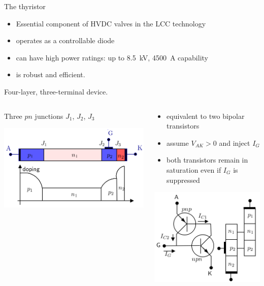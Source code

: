 \begin{frame}[allowframebreaks]{The thyristor}
\begin{itemize}
    \item Essential component of HVDC valves in the LCC technology
    \item operates as a controllable diode
    \item can have high power ratings: up to \SI{8.5}{kV}, \SI{4500}{A} capability
    \item is robust and efficient.
\end{itemize}
Four-layer, three-terminal device.
\begin{columns}
\begin{column}{0.5\linewidth}
Three $pn$ junctions $J_1$, $ J_2$, $J_3$
\begin{center}
    \includegraphics[width=1.0\linewidth]{images/thyristor1.png}
\end{center}
\end{column}
\begin{column}{0.5\linewidth}
\begin{itemize}
    \item equivalent to two bipolar transistors
    \item assume $V_{AK}>0$ and inject $I_G$
    \item both transistors remain in saturation even if $I_G$ is suppressed
\end{itemize}
\begin{center}
    \includegraphics[width=0.5\linewidth]{images/thyristor2.png}
\end{center}
\end{column}
\end{columns}
\end{frame}

